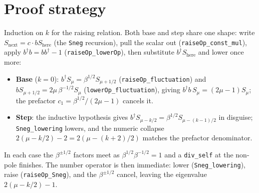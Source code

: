 \documentclass[11pt]{article}
\begin{document}
\section{Proof strategy}
Induction on $k$ for the raising relation. Both base and step share one shape: write
$S_{\text{next}}=c\cdot bS_{\text{here}}$ (the \texttt{Sneg} recursion), pull the scalar out
(\texttt{raiseOp\_const\_mul}), apply $b^\dagger b=bb^\dagger-1$ (\texttt{raiseOp\_lowerOp}), then
substitute $b^\dagger S_{\text{here}}$ and lower once more:
\begin{itemize}
\item \textbf{Base} ($k=0$): $b^\dagger S_\mu=\beta^{1/2}S_{\mu+1/2}$
(\texttt{raiseOp\_fluctuation}) and $bS_{\mu+1/2}=2\mu\,\beta^{-1/2}S_\mu$
(\texttt{lowerOp\_fluctuation}), giving $b^\dagger b\,S_\mu=(2\mu-1)S_\mu$; the prefactor
$c_1=\beta^{1/2}/(2\mu-1)$ cancels it.
\item \textbf{Step}: the inductive hypothesis gives $b^\dagger S_{\mu-k/2}=\beta^{1/2}S_{\mu-(k-1)/2}$
in disguise; \texttt{Sneg\_lowering} lowers, and the numeric collapse
$2(\mu-k/2)-2=2(\mu-(k+2)/2)$ matches the prefactor denominator.
\end{itemize}
In each case the $\beta^{\pm1/2}$ factors meet as $\beta^{1/2}\beta^{-1/2}=1$ and a
\texttt{div\_self} at the non-pole finishes. The number operator is then immediate: lower
(\texttt{Sneg\_lowering}), raise (\texttt{raiseOp\_Sneg}), and the $\beta^{\pm1/2}$ cancel, leaving
the eigenvalue $2(\mu-k/2)-1$.
\end{document}
